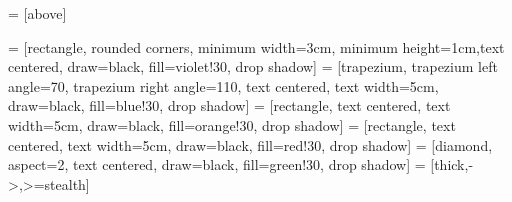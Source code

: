 \newcommand{\vspacing}{0.8cm}

\usetikzlibrary{shapes.geometric, arrows, positioning, shadows}


 = [above]

\newcommand{\background}[5]{%
  \begin{pgfonlayer}{background}
    \path (#1.west |- #2.north)+(-0.5,0.5) node (a1) {};
    \path (#3.east |- #4.south)+(+0.5,-0.25) node (a2) {};
    \path[fill=yellow!20,rounded corners, draw=black!50, dashed]
      (a1) rectangle (a2);
    \path (a1.east |- a1.south)+(1.2,-0.3) node (u1)[texte]
      {\scriptsize\textit{DPU execution}};
  \end{pgfonlayer}}

 = [rectangle, rounded corners, minimum width=3cm, minimum height=1cm,text centered, draw=black, fill=violet!30, drop shadow]
 = [trapezium, trapezium left angle=70, trapezium right angle=110, text centered, text width=5cm, draw=black, fill=blue!30, drop shadow]
 = [rectangle, text centered, text width=5cm, draw=black, fill=orange!30, drop shadow]
 = [rectangle, text centered, text width=5cm, draw=black, fill=red!30, drop shadow]
 = [diamond, aspect=2, text centered, draw=black, fill=green!30, drop shadow]
 = [thick,->,>=stealth]